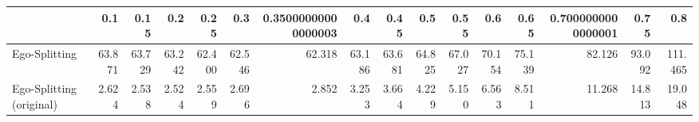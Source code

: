 \begin{tabular}{lrrrrrrrrrrrrrrr}
\toprule
{} &    0.1 &   0.15 &    0.2 &   0.25 &    0.3 & 0.35000000000000003 &    0.4 &   0.45 &    0.5 &   0.55 &    0.6 &   0.65 & 0.7000000000000001 &   0.75 &     0.8 \\
\midrule
Ego-Splitting            & 63.871 & 63.729 & 63.242 & 62.400 & 62.546 &              62.318 & 63.186 & 63.681 & 64.825 & 67.027 & 70.154 & 75.139 &             82.126 & 93.092 & 111.465 \\
Ego-Splitting (original) &  2.624 &  2.538 &  2.524 &  2.559 &  2.696 &               2.852 &  3.253 &  3.664 &  4.229 &  5.150 &  6.563 &  8.511 &             11.268 & 14.813 &  19.048 \\
\bottomrule
\end{tabular}
